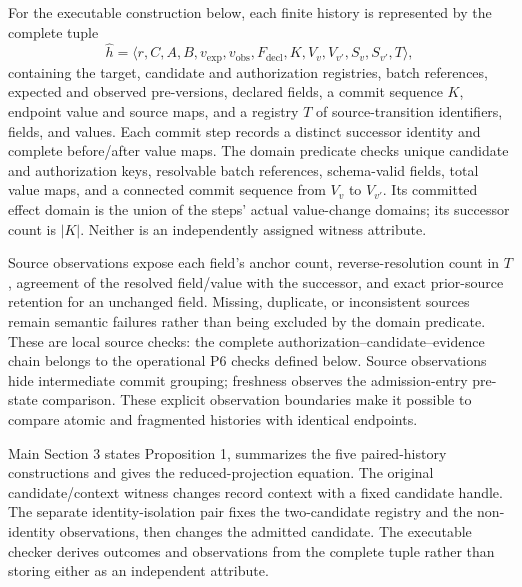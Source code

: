 \documentclass[11pt,a4paper]{article}
\begin{document}
For the executable construction below, each finite history is represented by the complete tuple
\begin{equation}
\widehat h=\langle r,C,A,B,v_{\mathrm{exp}},v_{\mathrm{obs}},
F_{\mathrm{decl}},K,V_v,V_{v'},S_v,S_{v'},T\rangle,
\label{eq:witness-history}
\end{equation}
containing the target, candidate and authorization registries, batch references, expected and observed pre-versions, declared fields, a commit sequence $K$, endpoint value and source maps, and a registry $T$ of source-transition identifiers, fields, and values. Each commit step records a distinct successor identity and complete before/after value maps. The domain predicate checks unique candidate and authorization keys, resolvable batch references, schema-valid fields, total value maps, and a connected commit sequence from $V_v$ to $V_{v'}$. Its committed effect domain is the union of the steps' actual value-change domains; its successor count is $|K|$. Neither is an independently assigned witness attribute.

Source observations expose each field's anchor count, reverse-resolution count in $T$, agreement of the resolved field/value with the successor, and exact prior-source retention for an unchanged field. Missing, duplicate, or inconsistent sources remain semantic failures rather than being excluded by the domain predicate. These are local source checks: the complete authorization--candidate--evidence chain belongs to the operational P6 checks defined below. Source observations hide intermediate commit grouping; freshness observes the admission-entry pre-state comparison. These explicit observation boundaries make it possible to compare atomic and fragmented histories with identical endpoints.

Main Section 3 states Proposition 1, summarizes the five paired-history constructions and gives the reduced-projection equation. The original candidate/context witness changes record context with a fixed candidate handle. The separate identity-isolation pair fixes the two-candidate registry and the non-identity observations, then changes the admitted candidate. The executable checker derives outcomes and observations from the complete tuple rather than storing either as an independent attribute.
\end{document}
